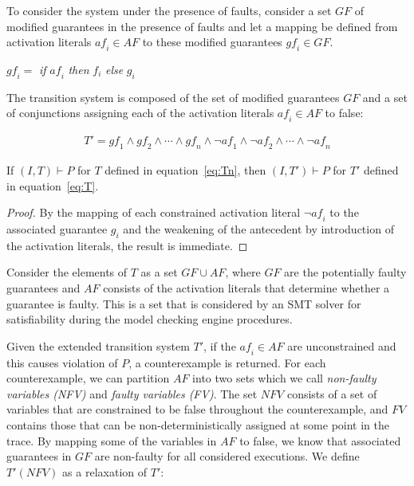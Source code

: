 
To consider the system under the presence of faults, consider a set $GF$ of modified guarantees in the presence of faults and let a mapping be defined from activation literals $\mathit{af}_i \in AF$ to these modified guarantees $\mathit{gf}_i \in GF$. 
\begin{center}
$\mathit{gf}_i =$ \textit{if} $\mathit{af}_i$ \textit{then} $f_i$ \textit{else} $g_i$\\
\label{eq:sigma}
\end{center}

The transition system is composed of the set of modified guarantees $GF$ and a set of conjunctions assigning each of the activation literals $\mathit{af}_i \in AF$ to false: 

\begin{gather}
T' = \mathit{gf}_1 \land \mathit{gf}_2 \land \cdots \land \mathit{gf}_n \land \neg \mathit{af}_1 \land \neg \mathit{af}_2 \land \cdots \land \neg \mathit{af}_n
\label{eq:T}
\end{gather}

\begin{theorem} If $(I,T) \vdash P$ for $T$ defined in equation~\ref{eq:Tn}, then $(I,T') \vdash P$ for $T'$ defined in equation~\ref{eq:T}.
\begin{proof}
By the mapping of each constrained activation literal $\neg \mathit{af}_i$ to the associated guarantee $g_i$ and the weakening of the antecedent by introduction of the activation literals, the result is immediate.
\end{proof}
\end{theorem}

Consider the elements of $T$ as a set $GF \cup AF$, where $GF$ are the potentially faulty guarantees and $AF$ consists of the activation literals that determine whether a guarantee is faulty. This is a set that is considered by an SMT solver for satisfiability during the model checking engine procedures. 

Given the extended transition system $T'$, if the $\mathit{af}_i \in \mathit{AF}$ are unconstrained and this causes violation of $P$, a counterexample is returned. For each counterexample, we can partition $\mathit{AF}$ into two sets which we call {\em non-faulty variables (NFV)} and {\em faulty variables (FV)}.  The set $\mathit{NFV}$ consists of a set of variables that are constrained to be false throughout the counterexample, and $\mathit{FV}$ contains those that can be non-deterministically assigned at some point in the trace. By mapping some of the variables in $\mathit{AF}$ to false, we know that associated guarantees in $\mathit{GF}$ are non-faulty for all considered executions. We define $T'(\mathit{NFV})$ as a relaxation of $T'$:

